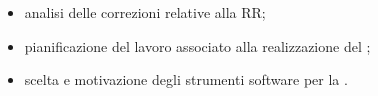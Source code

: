 \begin{itemize}
	\item analisi delle correzioni relative alla RR;
	\item pianificazione del lavoro associato alla realizzazione del ;
	\item scelta e motivazione degli strumenti software per la .
\end{itemize}
